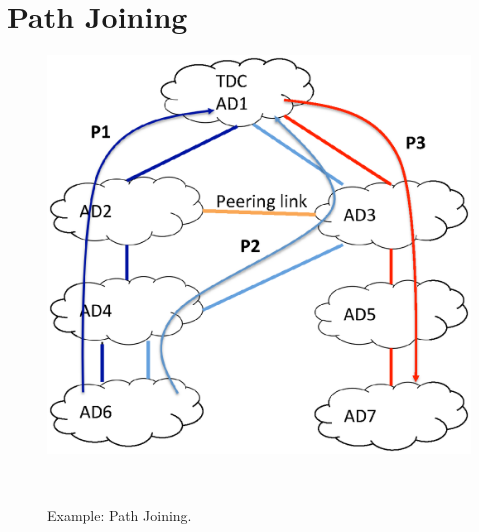 \chapter{Path Joining}

\begin{figure}[ht]
\centering
\includegraphics[width=.7\columnwidth]{./fig/pathjoin.eps}
\caption{Example: Path Joining.}~\label{fig:pathjoin}
\end{figure}

